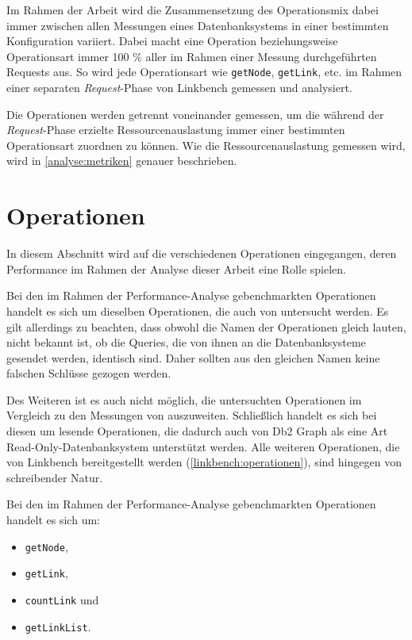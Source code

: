Im Rahmen der Arbeit wird die Zusammensetzung des Operationsmix dabei immer zwischen allen Messungen eines Datenbanksystems in einer bestimmten Konfiguration variiert. Dabei macht eine Operation beziehungsweise Operationsart immer 100 \% aller im Rahmen einer Messung durchgeführten Requests aus. So wird jede Operationsart wie \texttt{getNode}, \texttt{getLink}, etc. im Rahmen einer separaten \textit{Request}-Phase von Linkbench gemessen und analysiert.

Die Operationen werden getrennt voneinander gemessen, um die während der \textit{Request}-Phase erzielte Ressourcenauslastung immer einer bestimmten Operationsart zuordnen zu können. Wie die Ressourcenauslastung gemessen wird, wird in \autoref{analyse:metriken} genauer beschrieben.

\section{Operationen}
\label{analyse:operationen}
In diesem Abschnitt wird auf die verschiedenen Operationen eingegangen, deren Performance im Rahmen der Analyse dieser Arbeit eine Rolle spielen. 

Bei den im Rahmen der Performance-Analyse gebenchmarkten Operationen handelt es sich um dieselben Operationen, die auch von  untersucht werden. Es gilt allerdings zu beachten, dass obwohl die Namen der Operationen gleich lauten, nicht bekannt ist, ob die Queries, die von ihnen an die Datenbanksysteme gesendet werden, identisch sind. Daher sollten aus den gleichen Namen keine falschen Schlüsse gezogen werden. 

Des Weiteren ist es auch nicht möglich, die untersuchten Operationen im Vergleich zu den Messungen von  auszuweiten. Schließlich handelt es sich bei diesen um lesende Operationen, die dadurch auch von Db2 Graph als eine Art Read-Only-Datenbanksystem unterstützt werden. Alle weiteren Operationen, die von Linkbench bereitgestellt werden (\autoref{linkbench:operationen}), sind hingegen von schreibender Natur. 

Bei den im Rahmen der Performance-Analyse gebenchmarkten Operationen handelt es sich um:
\begin{itemize}
    \item \texttt{getNode},
    \item \texttt{getLink},
    \item \texttt{countLink} und
    \item \texttt{getLinkList}. 
\end{itemize}

